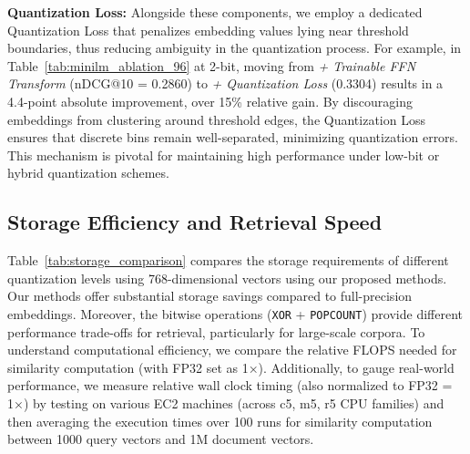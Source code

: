 \noindent
\textbf{Quantization Loss:}
Alongside these components, we employ a dedicated Quantization Loss that penalizes embedding values lying near threshold boundaries, thus reducing ambiguity in the quantization process. For example, in Table~\ref{tab:minilm_ablation_96} at 2-bit, moving from \textit{+ Trainable FFN Transform} (nDCG@10 = 0.2860) to \textit{+ Quantization Loss} (0.3304) results in a 4.4-point absolute improvement, over 15\% relative gain. By discouraging embeddings from clustering around threshold edges, the Quantization Loss ensures that discrete bins remain well-separated, minimizing quantization errors. This mechanism is pivotal for maintaining high performance under low-bit or hybrid quantization schemes.

\subsection{Storage Efficiency and Retrieval Speed}

Table~\ref{tab:storage_comparison} compares the storage requirements of different quantization levels using 768-dimensional vectors using our proposed methods. 
Our methods offer substantial storage savings compared to full-precision embeddings. 
Moreover, the bitwise operations (\texttt{XOR} + \texttt{POPCOUNT}) provide different performance trade-offs for retrieval, particularly for large-scale corpora. 
To understand computational efficiency, we compare the relative FLOPS needed for similarity computation (with FP32 set as 1×). 
Additionally, to gauge real-world performance, we measure relative wall clock timing (also normalized to FP32 = 1×) by testing on various EC2 machines (across c5, m5, r5 CPU families) and then averaging the execution times over 100 runs for similarity computation between 1000 query vectors and 1M document vectors.


